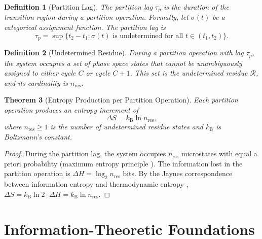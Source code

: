 \documentclass[twocolumn,10pt]{article}
\newtheorem{theorem}{Theorem}[section]
\newtheorem{definition}[theorem]{Definition}
\theoremstyle{remark}
\newcommand{\kB}{k_{\mathrm{B}}}
\begin{document}
\begin{definition}[Partition Lag]
\label{def:partition_lag}
The \emph{partition lag} $\tau_p$ is the duration of the transition region during a partition operation.  Formally, let $\sigma(t)$ be a categorical assignment function.  The partition lag is
\begin{equation}
    \tau_p = \sup\{t_2 - t_1 : \sigma(t) \text{ is undetermined for all } t \in (t_1, t_2)\}.
    \label{eq:partition_lag}
\end{equation}
\end{definition}

\begin{definition}[Undetermined Residue]
\label{def:undetermined_residue}
During a partition operation with lag $\tau_p$, the system occupies a set of phase space states that cannot be unambiguously assigned to either cycle $C$ or cycle $C+1$.  This set is the \emph{undetermined residue} $\mathcal{R}$, and its cardinality is $n_{\text{res}}$.
\end{definition}

\begin{theorem}[Entropy Production per Partition Operation]
\label{thm:entropy_production}
Each partition operation produces an entropy increment of
\begin{equation}
    \Delta S = \kB \ln n_{\text{res}},
    \label{eq:entropy_partition}
\end{equation}
where $n_{\text{res}} \geq 1$ is the number of undetermined residue states and $\kB$ is Boltzmann's constant.
\end{theorem}

\begin{proof}
During the partition lag, the system occupies $n_{\text{res}}$ microstates with equal a priori probability (maximum entropy principle \cite{jaynes1957a}).  The information lost in the partition operation is $\Delta H = \log_2 n_{\text{res}}$ bits.  By the Jaynes correspondence between information entropy and thermodynamic entropy \cite{jaynes1957a,jaynes1957b}, $\Delta S = \kB \ln 2 \cdot \Delta H = \kB \ln n_{\text{res}}$.
\end{proof}


\section{Information-Theoretic Foundations}
\label{sec:info_theory}
\end{document}
